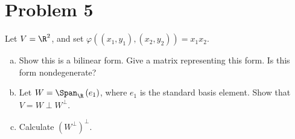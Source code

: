 \documentclass[10pt]{mypackage}
\begin{document}
\section{Problem 5}%
\begin{problem}
  Let $V = \R^2$, and set $\varphi\left(\left(x_1,y_1\right),\left(x_2,y_2\right)\right) = x_1x_2$.
  \begin{enumerate}[(a)]
    \item Show this is a bilinear form. Give a matrix representing this form. Is this form nondegenerate?
    \item Let $W = \Span_{\R}\left(e_1\right)$, where $e_1$ is the standard basis element. Show that $V = W \perp W^{\perp}$.
    \item Calculate $\left(W^{\perp}\right)^{\perp}$.
  \end{enumerate}
\end{problem}
\end{document}
